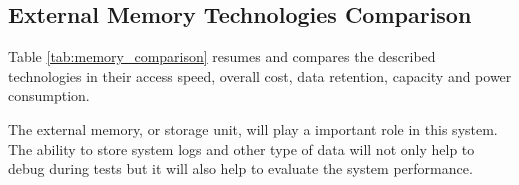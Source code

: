 \subsection{External Memory Technologies Comparison}
Table \ref{tab:memory_comparison} resumes and compares the described technologies in their access speed, overall cost, data retention, capacity and power consumption.
\begin{table}[H]
    \centering
    \caption{Comparison of External Memory Technologies}
    \label{tab:memory_comparison}
\end{table}

The external memory, or storage unit, will play a important role in this system.
The ability to store system logs and other type of data will not only help to debug during tests but it will also help to evaluate the system performance.

